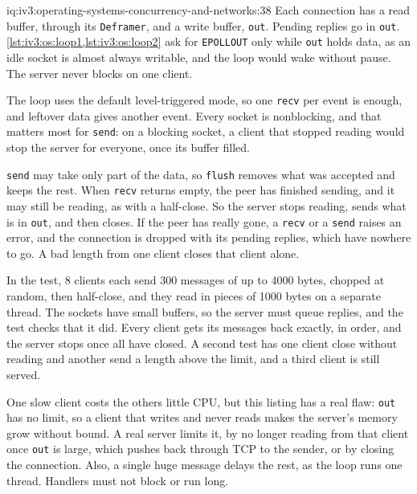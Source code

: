 \begin{solution}{iq:iv3:operating-systems-concurrency-and-networks:38}
Each connection has a read buffer, through its \texttt{Deframer}, and a write buffer, \texttt{out}. Pending replies go in \texttt{out}. \cref{lst:iv3:os:loop1,lst:iv3:os:loop2} ask for \texttt{EPOLLOUT} only while \texttt{out} holds data, as an idle socket is almost always writable, and the loop would wake without pause. The server never blocks on one client.
\label{lst:iv3:os:loop1}
\enlargethispage{-2\baselineskip}%
\label{lst:iv3:os:loop2}

The loop uses the default level-triggered mode, so one \texttt{recv} per event is enough, and leftover data gives another event. Every socket is nonblocking, and that matters most for \texttt{send}: on a blocking socket, a client that stopped reading would stop the server for everyone, once its buffer filled.

\texttt{send} may take only part of the data, so \texttt{flush} removes what was accepted and keeps the rest. When \texttt{recv} returns empty, the peer has finished sending, and it may still be reading, as with a half-close. So the server stops reading, sends what is in \texttt{out}, and then closes. If the peer has really gone, a \texttt{recv} or a \texttt{send} raises an error, and the connection is dropped with its pending replies, which have nowhere to go. A bad length from one client closes that client alone.

In the test, 8 clients each send 300 messages of up to 4000 bytes, chopped at random, then half-close, and they read in pieces of 1000 bytes on a separate thread. The sockets have small buffers, so the server must queue replies, and the test checks that it did. Every client gets its messages back exactly, in order, and the server stops once all have closed. A second test has one client close without reading and another send a length above the limit, and a third client is still served.

One slow client costs the others little CPU, but this listing has a real flaw: \texttt{out} has no limit, so a client that writes and never reads makes the server's memory grow without bound. A real server limits it, by no longer reading from that client once \texttt{out} is large, which pushes back through TCP to the sender, or by closing the connection. Also, a single huge message delays the rest, as the loop runs one thread. Handlers must not block or run long.

\end{solution}

